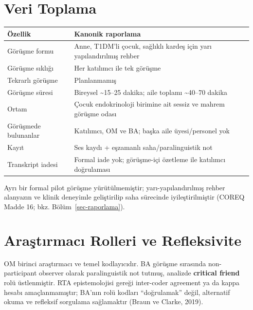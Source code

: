 \documentclass[
  turkish,
  a4paper,
  DIV=11,
  numbers=noendperiod]{scrreprt}
\newcounter{none} %
\begin{document}
\section{Veri Toplama}\label{veri-toplama}

{\def\LTcaptype{none} %
\begin{longtable}[]{@{}
  >{\raggedright\arraybackslash}p{}
  >{\raggedright\arraybackslash}p{}@{}}
\toprule\noalign{}
\begin{minipage}[b]{\linewidth}\raggedright
Özellik
\end{minipage} & \begin{minipage}[b]{\linewidth}\raggedright
Kanonik raporlama
\end{minipage} \\
\midrule\noalign{}
\endhead
\bottomrule\noalign{}
\endlastfoot
Görüşme formu & Anne, T1DM'li çocuk, sağlıklı kardeş için yarı
yapılandırılmış rehber \\
Görüşme sıklığı & Her katılımcı ile tek görüşme \\
Tekrarlı görüşme & Planlanmamış \\
Görüşme süresi & Bireysel \textasciitilde15--25 dakika; aile toplamı
\textasciitilde40--70 dakika \\
Ortam & Çocuk endokrinoloji birimine ait sessiz ve mahrem görüşme
odası \\
Görüşmede bulunanlar & Katılımcı, OM ve BA; başka aile üyesi/personel
yok \\
Kayıt & Ses kaydı + eşzamanlı saha/paralinguistik not \\
Transkript iadesi & Formal iade yok; görüşme-içi özetleme ile katılımcı
doğrulaması \\
\end{longtable}
}

Ayrı bir formal pilot görüşme yürütülmemiştir; yarı-yapılandırılmış
rehber alanyazın ve klinik deneyimle geliştirilip saha sürecinde
iyileştirilmiştir (COREQ Madde 16; bkz. Bölüm~\ref{sec-raporlama}).

\section{Araştırmacı Rolleri ve
Refleksivite}\label{araux15ftux131rmacux131-rolleri-ve-refleksivite}

OM birinci araştırmacı ve temel kodlayıcıdır. BA görüşme sırasında
non-participant observer olarak paralinguistik not tutmuş, analizde
\textbf{critical friend} rolü üstlenmiştir. RTA epistemolojisi gereği
inter-coder agreement ya da kappa hesabı amaçlanmamıştır; BA'nın rolü
kodları ``doğrulamak'' değil, alternatif okuma ve refleksif sorgulama
sağlamaktır (Braun ve Clarke, 2019).
\end{document}
